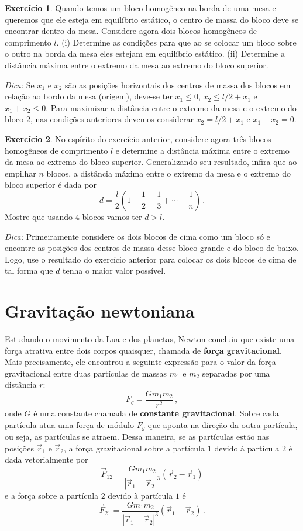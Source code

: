 \documentclass[twocolumn=on,fontsize=12pt,DIV=calc]{scrartcl}
\newcommand{\dpar}[1]{\left(#1\right)}
\theoremstyle{definition}
\newtheorem{ex}{Exercício}[section]
\begin{document}
\begin{ex}
  Quando temos um bloco homogêneo na borda de uma mesa e queremos que
  ele esteja em equilíbrio estático, o centro de massa do bloco deve
  se encontrar dentro da mesa. Considere agora dois blocos homogêneos
  de comprimento $l$. (i) Determine as condições para que ao se
  colocar um bloco sobre o outro na borda da mesa eles estejam em
  equilíbrio estático. (ii) Determine a distância máxima entre o
  extremo da mesa ao extremo do bloco superior.

  \noindent\textit{Dica:} Se $x_1$ e $x_2$ são as posições horizontais
  dos centros de massa dos blocos em relação ao bordo da mesa
  (origem), deve-se ter $x_1\le 0$, $x_2\le l/2+x_1$ e $x_1+x_2\le
  0$. Para maximizar a distância entre o extremo da mesa e o extremo
  do bloco $2$, nas condições anteriores devemos considerar
  $x_2=l/2+x_1$ e $x_1+x_2=0$.
\end{ex}

\begin{ex}
  No espírito do exercício anterior, considere agora três blocos
  homogêneos de comprimento $l$ e determine a distância máxima entre o
  extremo da mesa ao extremo do bloco superior. Generalizando seu
  resultado, infira que ao empilhar $n$ blocos, a distância máxima
  entre o extremo da mesa e o extremo do bloco superior é dada por
  $$d=\frac{l}{2}\dpar{1+\frac{1}{2}+\frac{1}{3}+\cdots+\frac{1}{n}}\,.$$
  Mostre que usando $4$ blocos vamos ter $d>l$.

  \noindent\textit{Dica:} Primeiramente considere os dois blocos de
  cima como um bloco só e encontre as posições dos centros de massa
  desse bloco grande e do bloco de baixo. Logo, use o resultado do
  exercício anterior para colocar os dois blocos de cima de tal forma
  que $d$ tenha o maior valor possível.
\end{ex}

\section{Gravitação newtoniana}

Estudando o movimento da Lua e dos planetas, Newton concluiu que
existe uma força atrativa entre dois corpos quaisquer, chamada de
\textbf{força gravitacional}. Mais precisamente, ele encontrou a
seguinte expressão para o valor da força gravitacional entre duas
partículas de massas $m_1$ e $m_2$ separadas por uma distância $r$:
$$F_g=\frac{Gm_1m_2}{r^2}\,,$$
onde $G$ é uma constante chamada de \textbf{constante gravitacional}.
Sobre cada partícula atua uma força de módulo $F_g$ que aponta na
direção da outra partícula, ou seja, as partículas se atraem. Dessa
maneira, se as partículas estão nas posições $\vec r_1$ e $\vec r_2$,
a força gravitacional sobre a partícula $1$ devido à partícula $2$ é
dada vetorialmente por
$$\vec F_{12}=\frac{Gm_1m_2}{|\vec r_1-\vec r_2|^3}(\vec r_2-\vec r_1)$$
e a força sobre a partícula $2$ devido à partícula $1$ é
$$\vec F_{21}=\frac{Gm_1m_2}{|\vec r_1-\vec r_2|^3}(\vec r_1-\vec r_2)\,.$$
\end{document}
